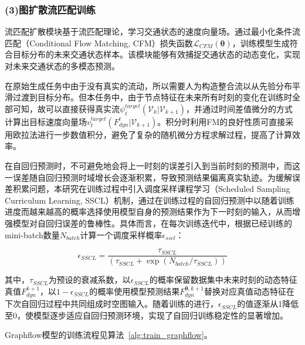     \subsubsection*{(3)图扩散流匹配训练}
      流匹配扩散模块基于流匹配理论，学习交通状态的速度向量场。通过最小化条件流匹配（Conditional Flow Matching, CFM）损失函数$\mathcal{L}_{CFM}(\bm{\theta})$，训练模型生成符合目标分布的未来交通状态样本。该模块能够有效捕捉交通状态的动态变化，实现对未来交通状态的多模态预测。

      在原始生成任务中由于没有真实的流动，所以需要人为构造整合流以从先验分布平滑过渡到目标分布。但本任务中，由于节点特征在未来所有时刻的变化在训练时全部可知，故可以直接获得真实流$\psi^{target}_t(\mathcal{V}_k|\mathcal{V}_{k+1})$，并通过时间差值微分的方式计算出目标速度向量场$v_t^{target}(F_{dyn}^{t}|\mathcal{V}_{k+1})$。积分时利用FM的良好性质可直接采用欧拉法进行一步数值积分，避免了复杂的随机微分方程求解过程，提高了计算效率。


      在自回归预测时，不可避免地会将上一时刻的误差引入到当前时刻的预测中，而这一误差随自回归预测时域增长会逐渐积累，导致预测结果偏离真实轨迹。为缓解误差积累问题，本研究在训练过程中引入调度采样课程学习（Scheduled Sampling Curriculum Learning, SSCL）机制，通过在训练过程的自回归预测中以随着训练进度而越来越高的概率选择使用模型自身的预测结果作为下一时刻的输入，从而增强模型对自回归误差的鲁棒性\cite{DCRNN2018}。具体而言，在每次训练迭代中，根据已经训练的mini-batch数量$N_{batch}$计算一个调度采样概率$\epsilon_{sscl}$：

      \begin{equation}
        \epsilon_{SSCL} = \frac{\tau_{SSCL}}{(\tau_{SSCL} + \exp(N_{batch}/\tau_{SSCL}))}
      \end{equation}
      
      \noindent 其中，$\tau_{SSCL}$为预设的衰减系数，以$\epsilon_{SSCL}$的概率保留数据集中未来时刻的动态特征真值$F_{dyn}^{k+1}$，以$1-\epsilon_{SSCL}$的概率使用模型预测结果$F_{dyn}^{\bm{\theta},k+1}$替换对应真值动态特征在下次自回归过程中共同组成时空图输入。随着训练的进行，$\epsilon_{SSCL}$的值逐渐从1降低至0，使模型逐步适应自回归预测环境，实现了自回归训练稳定性的显著增加。

      Graphflow模型的训练流程见算法~\ref{alg:train_graphflow}。

      \renewcommand{\algorithmicrequire}{\textbf{输入：}\unskip}
      \renewcommand{\algorithmicensure}{\textbf{输出：}\unskip}

